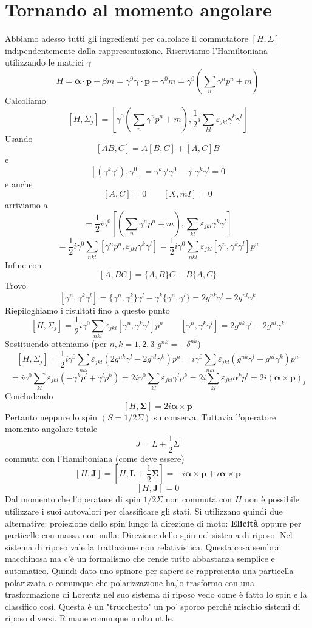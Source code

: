 \section{Tornando al momento angolare}
Abbiamo adesso tutti gli ingredienti per calcolare il commutatore $\left[H,\Sigma\right]$ indipendentemente dalla rappresentazione. Riscriviamo l'Hamiltoniana utilizzando le matrici $\gamma$
$$
H = \boldsymbol{\alpha} \cdot \mathbf{p} + \beta m = \gamma^0 \boldsymbol{\gamma} \cdot \mathbf{p} + \gamma^0 m = \gamma^0 \left( \sum_n \gamma^n p^n + m \right)
$$
Calcoliamo
$$
[H, \Sigma_j] = \left[ \gamma^0 \left( \sum_n \gamma^n p^n + m \right), \frac{1}{2} i \sum_{kl} \varepsilon_{jkl} \gamma^k \gamma^l \right]
$$
Usando
$$
[AB,C] = A[B,C] + [A,C]B
$$
e
$$
[(\gamma^k\gamma^l), \gamma^0] = \gamma^k\gamma^l\gamma^0 - \gamma^0\gamma^k\gamma^l = 0
$$
e anche
$$
[A,C] = 0 \qquad [X,mI] = 0
$$
arriviamo a 
$$
= \frac{1}{2} i \gamma^0 \left[ \left( \sum_n \gamma^n p^n + m \right), \sum_{kl} \varepsilon_{jkl} \gamma^k \gamma^l \right]
$$
$$
= \frac{1}{2} i \gamma^0 \sum_{nkl} [\gamma^n p^n, \varepsilon_{jkl} \gamma^k \gamma^l] = \frac{1}{2} i \gamma^0 \sum_{nkl} \varepsilon_{jkl} [\gamma^n, \gamma^k \gamma^l] p^n
$$
Infine con
$$
[A,BC] = \{A,B\}C - B\{A,C\}
$$
Trovo
$$
[\gamma^n, \gamma^k \gamma^l] = \{\gamma^n, \gamma^k\}\gamma^l - \gamma^k\{\gamma^n, \gamma^l\} = 2g^{nk}\gamma^l - 2g^{nl}\gamma^k
$$
Riepiloghiamo i risultati fino a questo punto
$$
[H, \Sigma_j] = \frac{1}{2} i \gamma^0 \sum_{nkl} \varepsilon_{jkl} [\gamma^n, \gamma^k \gamma^l] p^n \qquad [\gamma^n, \gamma^k \gamma^l] = 2g^{nk}\gamma^l - 2g^{nl}\gamma^k
$$
Sostituendo otteniamo (per $n,k=1,2,3$ $g^{nk}=-\delta^{nk}$)
$$
[H, \Sigma_j] = \frac{1}{2} i \gamma^0 \sum_{nkl} \varepsilon_{jkl} (2g^{nk}\gamma^l - 2g^{nl}\gamma^k) p^n = i\gamma^0 \sum_{nkl} \varepsilon_{jkl} (g^{nk}\gamma^l - g^{nl}\gamma^k) p^n
$$
$$
= i\gamma^0 \sum_{kl} \varepsilon_{jkl} (-\gamma^k p^l + \gamma^l p^k) = 2i\gamma^0 \sum_{kl} \varepsilon_{jkl} \gamma^l p^k = 2i \sum_{kl} \varepsilon_{jkl} \alpha^k p^l = 2i(\boldsymbol{\alpha} \times \mathbf{p})_j
$$
Concludendo
$$
[H, \boldsymbol{\Sigma}] = 2i\boldsymbol{\alpha} \times \mathbf{p}
$$
Pertanto neppure lo spin $(S=1/2\Sigma)$ su conserva. Tuttavia l'operatore momento angolare totale
$$
J = L + \frac{1}{2}\Sigma
$$
commuta con l'Hamiltoniana (come deve essere)
$$
[H, \mathbf{J}] =[H, \mathbf{L}+\frac{1}{2}\boldsymbol{\Sigma}]= -i\boldsymbol{\alpha} \times \mathbf{p} + i\boldsymbol{\alpha} \times \mathbf{p}
$$
$$
[H, \mathbf{J}] = 0
$$
Dal momento che l'operatore di spin $1/2\Sigma$ non commuta con $H$ non è possibile utilizzare i suoi autovalori per classificare gli stati. Si utilizzano quindi due alternative: proiezione dello spin lungo la direzione di moto: \textbf{Elicità} oppure per particelle con massa non nulla: Direzione dello spin nel sistema di riposo. Nel sistema di riposo vale la trattazione non relativistica. Questa cosa sembra macchinosa ma c'è un formalismo che rende tutto abbastanza semplice e automatico. Quindi dato uno spinore per sapere se rappresenta una particella polarizzata o comunque che polarizzazione ha,lo trasformo con una trasformazione di Lorentz nel suo sistema di riposo vedo come è fatto lo spin e la classifico così. Questa è un "trucchetto" un po' sporco perché mischio sistemi di riposo diversi. Rimane comunque molto utile.
